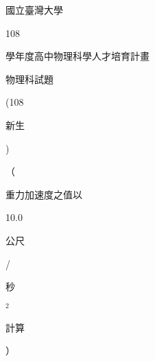 \documentclass[10pt]{article}
\begin{document}
\begin{CJK}{UTF8}{mj}國立臺灣大學\end{CJK} 108 \begin{CJK}{UTF8}{mj}學年度高中物理科學人才培育計畫\end{CJK} \begin{CJK}{UTF8}{mj}物理科試題\end{CJK} (108 \begin{CJK}{UTF8}{mj}新生\end{CJK})

（\begin{CJK}{UTF8}{mj}重力加速度之值以\end{CJK} 10.0 \begin{CJK}{UTF8}{mj}公尺\end{CJK}/\begin{CJK}{UTF8}{mj}秒\end{CJK} ${ }^{2}$ \begin{CJK}{UTF8}{mj}計算\end{CJK}）
\end{document}
